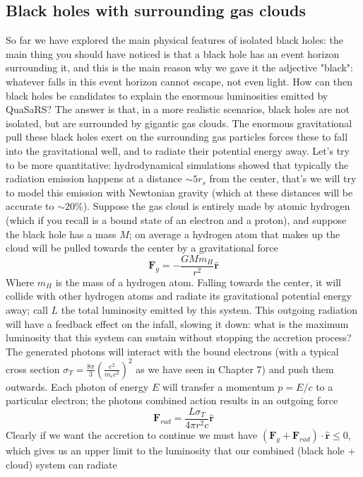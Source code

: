 \subsection{Black holes with surrounding gas clouds}  
So far we have explored the main physical features of isolated black holes: the main thing you should have noticed is that a black hole has an event horizon surrounding it, and this is the main reason why we gave it the adjective "black": whatever falls in this event horizon cannot escape, not even light. How can then black holes be candidates to explain the enormous luminosities emitted by QuaSaRS? The answer is that, in a more realistic scenarios, black holes are not isolated, but are surrounded by gigantic gas clouds. The enormous gravitational pull these black holes exert on the surrounding gas particles forces these to fall into the gravitational well, and to radiate their potential energy away. Let's try to be more quantitative: hydrodynamical simulations showed that typically the radiation emission happens at a distance $\sim 5r_s$ from the center, that's we will try to model this emission with Newtonian gravity (which at these distances will be accurate to $\sim 20\%$). Suppose the gas cloud is entirely made by atomic hydrogen (which if you recall is a bound state of an electron and a proton), and suppose the black hole has a mass $M$; on average a hydrogen atom that makes up the cloud will be pulled towards the center by a gravitational force
\begin{equation}
\mathbf{F}_g = -\frac{GMm_H}{r^2}\hat{\mathbf{r}}
\end{equation}
Where $m_H$ is the mass of a hydrogen atom. Falling towards the center, it will collide with other hydrogen atoms and radiate its gravitational potential energy away; call $L$ the total luminosity emitted by this system. This outgoing radiation will have a feedback effect on the infall, slowing it down: what is the maximum luminosity that this system can sustain without stopping the accretion process? The generated photons will interact with the bound electrons (with a typical cross section $\sigma_T=\frac{8\pi}{3}\left(\frac{e^2}{m_ec^2}\right)^2$ as we have seen in Chapter 7) and push them outwards. Each photon of energy $E$ will transfer a momentum $p=E/c$ to a particular electron; the photons combined action results in an outgoing force
\begin{equation}
\mathbf{F}_{rad}=\frac{L\sigma_T}{4\pi r^2 c}\hat{\mathbf{r}}
\end{equation}
Clearly if we want the accretion to continue we must have $(\mathbf{F}_g+\mathbf{F}_{rad})\cdot \hat{\mathbf{r}}\leq0$, which gives us an upper limit to the luminosity that our combined (black hole + cloud) system can radiate
